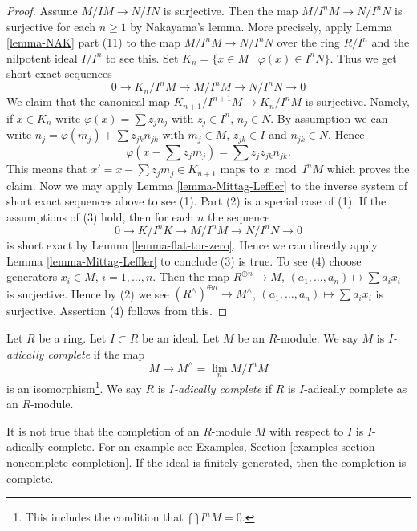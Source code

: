 \begin{proof}
Assume $M/IM \to N/IN$ is surjective. Then the map $M/I^nM \to N/I^nN$
is surjective for each $n \geq 1$ by Nakayama's lemma. More precisely,
apply Lemma \ref{lemma-NAK} part (11) to the
map $M/I^nM \to N/I^nN$ over the ring $R/I^n$ and the nilpotent
ideal $I/I^n$ to see this. Set $K_n = \{x \in M \mid \varphi(x) \in I^nN\}$.
Thus we get short exact sequences
$$
0 \to K_n/I^nM \to M/I^nM \to N/I^nN \to 0
$$
We claim that the canonical map $K_{n + 1}/I^{n + 1}M \to K_n/I^nM$
is surjective. Namely, if $x \in K_n$ write
$\varphi(x) = \sum z_j n_j$ with $z_j \in I^n$, $n_j \in N$.
By assumption we can write $n_j = \varphi(m_j) + \sum z_{jk}n_{jk}$
with $m_j \in M$, $z_{jk} \in I$ and $n_{jk} \in N$. Hence
$$
\varphi(x - \sum z_j m_j) = \sum z_jz_{jk} n_{jk}.
$$
This means that $x' = x - \sum z_j m_j \in K_{n + 1}$ maps
to $x \bmod I^nM$ which proves the claim. Now we may apply
Lemma \ref{lemma-Mittag-Leffler}
to the inverse system of short exact sequences above to see (1).
Part (2) is a special case of (1).
If the assumptions of (3) hold, then for each $n$ the sequence
$$
0 \to K/I^nK \to M/I^nM \to N/I^nN \to 0
$$
is short exact by
Lemma \ref{lemma-flat-tor-zero}.
Hence we can directly apply
Lemma \ref{lemma-Mittag-Leffler}
to conclude (3) is true.
To see (4) choose generators $x_i \in M$, $i = 1, \ldots, n$.
Then the map $R^{\oplus n} \to M$, $(a_1, \ldots, a_n) \mapsto \sum a_ix_i$
is surjective. Hence by (2) we see
$(R^\wedge)^{\oplus n} \to M^\wedge$, $(a_1, \ldots, a_n) \mapsto \sum a_ix_i$
is surjective. Assertion (4) follows from this.
\end{proof}

\begin{definition}
\label{definition-complete}
Let $R$ be a ring. Let $I \subset R$ be an ideal.
Let $M$ be an $R$-module. We say $M$ is {\it $I$-adically complete}
if the map
$$
M \longrightarrow M^\wedge = \lim_n M/I^nM
$$
is an isomorphism\footnote{This includes the condition that
$\bigcap I^nM = 0$.}. We say $R$ is {\it $I$-adically complete}
if $R$ is $I$-adically complete as an $R$-module.
\end{definition}

\noindent
It is not true that the completion of an $R$-module $M$ with respect
to $I$ is $I$-adically complete. For an example see
Examples, Section \ref{examples-section-noncomplete-completion}.
If the ideal is finitely generated, then the completion is complete.

